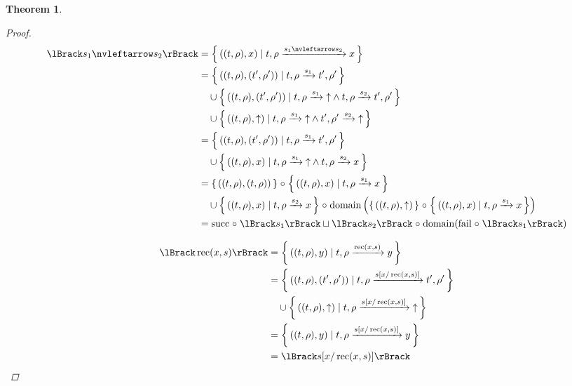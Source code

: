 \documentclass{article}
\newtheorem{theorem}{Theorem}
\newcommand{\fail}{\ensuremath \text{$\uparrow$}}
\newcommand{\leftchoice}[2]{\ensuremath #1 \nvleftarrow #2}
\newcommand{\fix}[2]{\ensuremath \operatorname{rec}(#1,#2)}
\newcommand{\subst}[3]{\ensuremath #1[#2 / #3]}
\newcommand{\transform}[5]{#1, #2 \xrightarrow{#3} #4, #5}
\newcommand{\transformx}[4]{#1, #2 \xrightarrow{#3} #4}
\newcommand{\transformfail}[3]{#1, #2 \xrightarrow{#3} \fail}
\newcommand{\sem}[1]{\ensuremath \lBrack #1 \rBrack}
\newcommand{\setbuild}[2]{\ensuremath \left\{\, #1 \mid #2 \,\right\}}
\newcommand{\setbuildc}[1]{\ensuremath \left\{\, #1 \,\right\}}
\newcommand{\domain}{\ensuremath \operatorname{domain}}
\newcommand{\lfail}{\ensuremath \operatorname{fail}}
\newcommand{\lsucc}{\ensuremath \operatorname{succ}}
\newcommand{\comp}{\ensuremath \mathrel{\circ}}
\begin{document}
\begin{theorem}
\begin{proof}
\begin{align*}
  \sem{\leftchoice{s_1}{s_2}}
     &= {\setbuild{((t,\rho),x)}{\transformx{t}{\rho}{\leftchoice{s_1}{s_2}}{x}}} \\
     &= {\setbuild{((t,\rho),(t',\rho'))}{\transform{t}{\rho}{s_1}{t'}{\rho'}}} \\
     &\quad \cup {\setbuild{((t,\rho),(t',\rho'))}{\transformfail{t}{\rho}{s_1} \land \transform{t}{\rho}{s_2}{t'}{\rho'}}} \\
     &\quad \cup {\setbuild{((t,\rho),\fail)}{\transformfail{t}{\rho}{s_1} \land \transformfail{t'}{\rho'}{s_2}}} \\
     &= {\setbuild{((t,\rho),(t',\rho'))}{\transform{t}{\rho}{s_1}{t'}{\rho'}}} \\
     &\quad \cup {\setbuild{((t,\rho),x)}{\transformfail{t}{\rho}{s_1} \land \transformx{t}{\rho}{s_2}{x}}} \\
     &= {\setbuildc{((t,\rho),(t,\rho))}} \comp {\setbuild{((t,\rho),x)}{\transformx{t}{\rho}{s_1}{x}}} \\
     & \quad \cup {\setbuild{((t,\rho),x)}{\transformx{t}{\rho}{s_2}{x}}} \comp \domain \left({\setbuildc{((t,\rho),\fail)}} \comp {\setbuild{((t,\rho),x)}{\transformx{t}{\rho}{s_1}{x}}}\right) \\
     &= \lsucc \comp \sem{s_1} \sqcup \sem{s_2} \comp \domain (\lfail \comp \sem{s_1})
\end{align*}

\begin{align*}
  \sem{\fix{x}{s}}
    &= {\setbuild{((t,\rho),y)}{\transformx{t}{\rho}{\fix{x}{s}}{y}}} \\
    &= {\setbuild{((t,\rho),(t',\rho'))}{\transform{t}{\rho}{\subst{s}{x}{\fix{x}{s}}}{t'}{\rho'}}} \\
    &\quad \cup {\setbuild{((t,\rho),\fail)}{\transformfail{t}{\rho}{\subst{s}{x}{\fix{x}{s}}}}} \\
    &= {\setbuild{((t,\rho),y)}{\transformx{t}{\rho}{\subst{s}{x}{\fix{x}{s}}}{y}}} \\
    &= \sem{\subst{s}{x}{\fix{x}{s}}}
\end{align*}


\end{proof}
\end{theorem}
\end{document}
